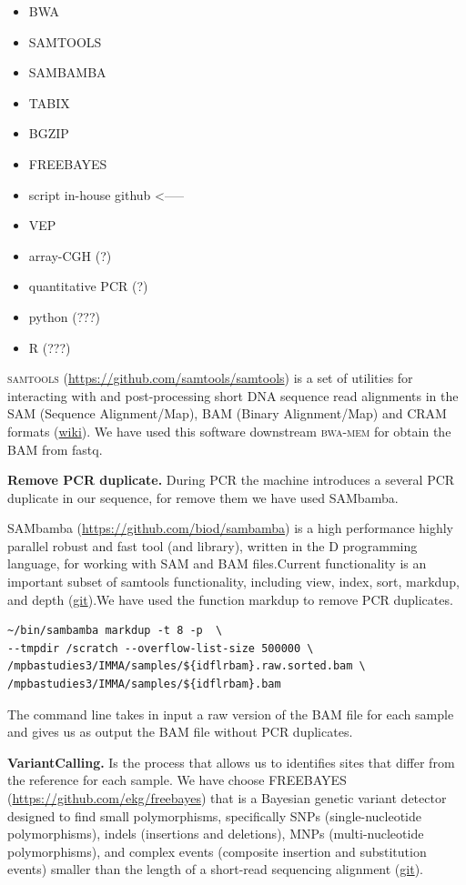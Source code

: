 \documentclass[
tikz,
11pt, %
oneside, %
english, %
singlespacing, %
headsepline, %
]{MastersDoctoralThesisV2} %
\begin{document}
\begin{itemize}
\item BWA 
\item SAMTOOLS
\item SAMBAMBA
\item TABIX
\item BGZIP
\item FREEBAYES
\item script in-house github  <-----
\item VEP
\item array-CGH (?)
\item quantitative PCR (?)
\item python (???)
\item R (???)
\end{itemize}




\textsc{samtools} (\url{https://github.com/samtools/samtools}) is a set of utilities for interacting with and post-processing short DNA sequence read alignments in the SAM (Sequence Alignment/Map), BAM (Binary Alignment/Map) and CRAM formats (\href{https://en.wikipedia.org/wiki/SAMtools}{wiki}). 
We have used this software downstream \textsc{bwa-mem} for obtain the BAM from fastq. 

\textbf{Remove PCR duplicate.} During PCR the machine introduces a several PCR duplicate in our sequence, for remove them we have used SAMbamba.

SAMbamba (\url{https://github.com/biod/sambamba}) is a high performance highly parallel robust and fast tool (and library), written in the D programming language, for working with SAM and BAM files.Current functionality is an important subset of samtools functionality, including view, index, sort, markdup, and depth (\href{https://github.com/biod/sambamba#introduction}{git}).We have used the function markdup to remove PCR duplicates. 

\begin{verbatim}
~/bin/sambamba markdup -t 8 -p  \
--tmpdir /scratch --overflow-list-size 500000 \
/mpbastudies3/IMMA/samples/${idflrbam}.raw.sorted.bam \
/mpbastudies3/IMMA/samples/${idflrbam}.bam    
\end{verbatim}

The command line takes in input a raw version of the BAM file for each sample and gives us as output the BAM file without PCR duplicates. 

\textbf{VariantCalling.} Is the process that allows us to identifies sites that differ from the reference for each sample. We have choose FREEBAYES (\url{https://github.com/ekg/freebayes}) that is a Bayesian genetic variant detector designed to find small polymorphisms, specifically SNPs (single-nucleotide polymorphisms), indels (insertions and deletions), MNPs (multi-nucleotide polymorphisms), and complex events (composite insertion and substitution events) smaller than the length of a short-read sequencing alignment (\href{https://github.com/ekg/freebayes}{git}).
\end{document}
